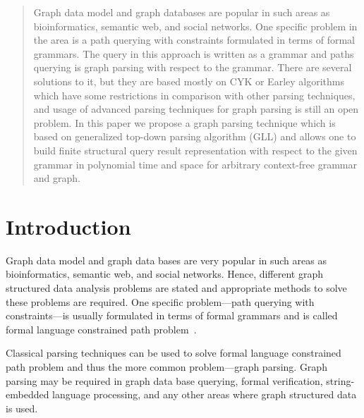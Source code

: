 \documentclass[runningheads,a4paper]{llncs}
\begin{document}
\begin{abstract}
Graph data model and graph databases are popular in such areas as bioinformatics, semantic web, and social networks.
One specific problem in the area is a path querying with constraints formulated in terms of formal grammars.
The query in this approach is written as a grammar and paths querying is graph parsing with respect to the grammar.
There are several solutions to it, but they are based mostly on CYK or Earley algorithms which have some restrictions in comparison with other parsing techniques, and usage of advanced parsing techniques for graph parsing is still an open problem.
In this paper we propose a graph parsing technique which is based on generalized top-down parsing algorithm (GLL) and allows one to build finite structural query result representation with respect to the given grammar in polynomial time and space for arbitrary context-free grammar and graph.


\end{abstract}






\section{Introduction}
Graph data model and graph data bases are very popular in such areas as bioinformatics, semantic web, and social networks.
Hence, different graph structured data analysis problems are stated and appropriate methods to solve these problems are required.
One specific problem---path querying with constraints---is usually formulated in terms of formal grammars and is called formal language constrained path problem~\cite{FLCpathProblem}.

Classical parsing techniques can be used to solve formal language constrained path problem and thus the more common problem---graph parsing. 
Graph parsing may be required in graph data base querying, formal verification, string-embedded language processing, and any other areas where graph structured data is used. 
\end{document}
